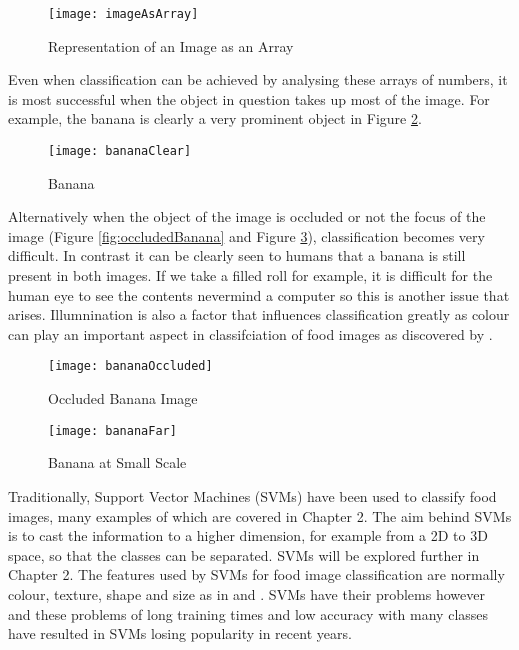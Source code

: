 \begin{figure}[h]
	\centering
	\texttt{[image: imageAsArray]}
	\caption{Representation of an Image as an Array}
	\label{fig:imageArray}
\end{figure}

Even when classification can be achieved by analysing these arrays of numbers, it is most successful when the object in question takes up most of the image.
For example, the banana is clearly a very prominent object in Figure \ref{fig:bananaClear}.

\begin{figure}[h]
	\texttt{[image: bananaClear]}
	\caption{Banana}
	\label{fig:bananaClear}
\end{figure}

Alternatively when the object of the image is occluded or not the focus of the image (Figure \ref{fig:occludedBanana} and Figure \ref{fig:farBanana}), classification becomes very difficult.
In contrast it can be clearly seen to humans that a banana is still present in both images.
If we take a filled roll for example, it is difficult for the human eye to see the contents nevermind a computer so this is another issue that arises.
Illumnination is also a factor that influences classification greatly as colour can play an important aspect in classifciation of food images as discovered by \parencite{novelSVM}.

\begin{figure}[h] 
  \label{ fig7} 
  \begin{minipage}[h]{0.5\linewidth}
    \centering
    \texttt{[image: bananaOccluded]} 
    \caption{Occluded Banana Image} 
  \label{fig:occludedBanana}
    \vspace{4ex}
  \end{minipage}%
  \begin{minipage}[h]{0.5\linewidth}
    \centering
    \texttt{[image: bananaFar]} 
    \caption{Banana at Small Scale} 
  \label{fig:farBanana}
    \vspace{4ex}
  \end{minipage} 
\end{figure}

Traditionally, Support Vector Machines (SVMs) have been used to classify food images, many examples of which are covered in Chapter 2.
The aim behind SVMs is to cast the information to a higher dimension, for
example from a 2D to 3D space, so that the classes can be separated. SVMs will be explored further in Chapter 2.
The features used by SVMs for food image classification are normally colour, texture, shape and size as in \parencite{pouladzadeh2014measuring} and \parencite{novelSVM}.
SVMs have their problems however and these problems of long training times and low accuracy with many classes have resulted in SVMs losing popularity in recent years.

